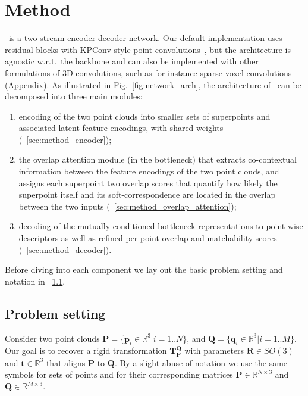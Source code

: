 \section{Method}
\label{sec:method}

\acro\ is a two-stream encoder-decoder network. Our default implementation uses residual blocks with KPConv-style point convolutions~\cite{thomas2019kpconv}, but the architecture is agnostic w.r.t.\ the backbone and can also be implemented with other formulations of 3D convolutions, such as for instance sparse voxel convolutions~\cite{choy2019Minkowski} (\cf Appendix). 
As illustrated in Fig.~\ref{fig:network_arch}, the architecture of \acro\ can be decomposed into three main modules:
\begin{enumerate}
\item encoding of the two point clouds into smaller sets of superpoints and associated latent feature encodings, with shared weights (~\cref{sec:method_encoder});
\item the overlap attention module (in the bottleneck) that extracts co-contextual information between the feature encodings of the two point clouds, and assigns each superpoint two overlap scores that quantify how likely the superpoint itself and its soft-correspondence are located in the overlap between the two inputs (~\cref{sec:method_overlap_attention}); 
\item decoding of the mutually conditioned bottleneck representations to point-wise descriptors as well as refined per-point overlap and matchability scores (~\cref{sec:method_decoder}).
\end{enumerate}
Before diving into each component we lay out the basic problem setting and notation in ~\cref{sec:method_notation}. %
\subsection{Problem setting}
\label{sec:method_notation}

Consider two point clouds $\mathbf{P}= \{\mathbf{p}_i \in \mathbb{R}^3| i = 1..N\}$, and $\mathbf{Q}= \{\mathbf{q}_i \in \mathbb{R}^3| i = 1..M\}$.
Our goal is to recover a rigid transformation $\mathbf{T}_\mathbf{P}^\mathbf{Q}$ with parameters $\mathbf{R} \in SO(3)$ and $\mathbf{t} \in \mathbb{R}^3$ that aligns %
$\mathbf{P}$ to $\mathbf{Q}$.
By a slight abuse of notation we use the same symbols for sets of points and for their corresponding matrices $\mathbf{P}\in\mathbb{R}^{N\times 3}$ and $\mathbf{Q}\in\mathbb{R}^{M\times 3}$.

